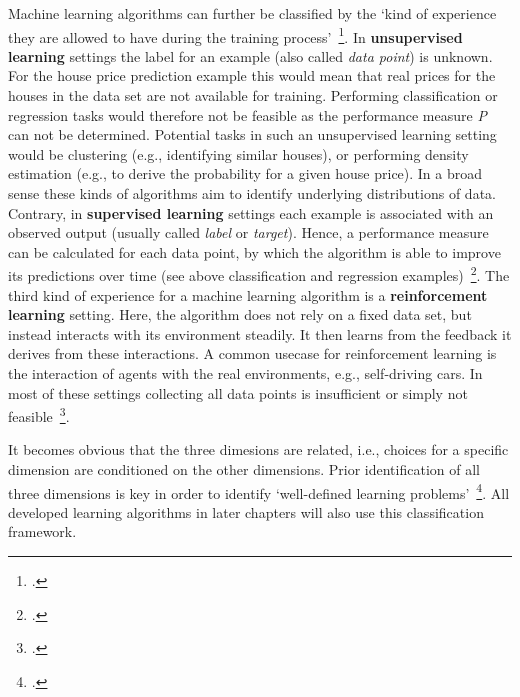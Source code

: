 Machine learning algorithms can further be classified by the `kind of experience
they are allowed to have during the training process'~\footcite[104]{Goodfellow2016}.
In \textbf{unsupervised learning} settings the label for an example (also called
\textit{data point}) is unknown. For the house price prediction example this
would mean that real prices for the houses in the data set are not
available for training. Performing classification or regression tasks would
therefore not be feasible as the performance measure \textit{P} can not be
determined. Potential tasks in such an unsupervised learning setting would be
clustering (e.g., identifying similar houses), or performing density estimation
(e.g., to derive the probability for a given house price). In a broad sense these
kinds of algorithms aim to identify underlying distributions of data. Contrary, in 
\textbf{supervised learning} settings each example is associated with an 
observed output (usually called \textit{label} or \textit{target}). Hence, a
performance measure can be calculated for each data point, by which the
algorithm is able to improve its predictions over time (see above classification
and regression examples)~\footcite{Goodfellow2016, Bishop2006}. The third kind of
experience for a machine learning algorithm is a \textbf{reinforcement learning}
setting. Here, the algorithm does not rely on a fixed data set, but instead 
interacts with its environment steadily. It then learns from the feedback it
derives from these interactions. A common usecase for reinforcement
learning is the interaction of agents with the real environments, e.g.,
self-driving cars. In most of these settings collecting all data points is
insufficient or simply not feasible~\footcite{Sutton1998}.

It becomes obvious that the three dimesions are related, i.e., choices for a
specific dimension are conditioned on the other dimensions. Prior identification 
of all three dimensions is key in order to identify 
`well-defined learning problems'~\footcite[2--3]{Mitchell1997}. All developed 
learning algorithms in later chapters will also use this classification 
framework. 
